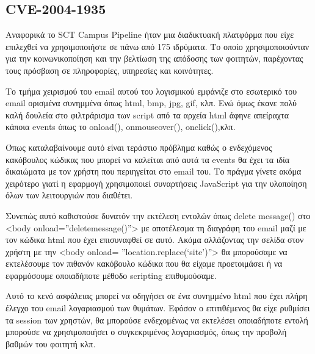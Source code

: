 \subsection{CVE-2004-1935}

\noindent
Αναφορικά το SCT Campus Pipeline ήταν μια διαδικτυακή πλατφόρμα που είχε επιλεχθεί να χρησιμοποιήστε σε πάνω από 175 ιδρύματα. Το οποίο χρησιμοποιούνταν για την κοινωνικοποίηση και την βελτίωση της απόδοσης των φοιτητών, παρέχοντας τους πρόσβαση σε πληροφορίες, υπηρεσίες και κοινότητες.


\noindent
Το τμήμα χειρισμού του email αυτού του λογισμικού εμφάνιζε στο εσωτερικό του email ορισμένα συνημμένα όπως html, bmp, jpg, gif, κλπ. Ενώ όμως έκανε πολύ καλή δουλεία στο φιλτράρισμα των script από τα αρχεία html άφηνε απείραχτα κάποια events όπως το onload(), onmouseover(), onclick(),κλπ. 

\noindent
Όπως καταλαβαίνουμε αυτό είναι τεράστιο πρόβλημα καθώς ο ενδεχόμενος κακόβουλος κώδικας που μπορεί να καλείται από αυτά τα events θα έχει τα ιδία δικαιώματα με τον χρήστη που περιηγείται στο email του. Το πράγμα γίνετε ακόμα χειρότερο γιατί η εφαρμογή χρησιμοποιεί συναρτήσεις JavaScript για την υλοποίηση όλων των λειτουργιών που διαθέτει. 

\noindent
Συνεπώς αυτό καθιστούσε δυνατόν την εκτέλεση εντολών όπως delete message() στο <body onload=”deletemessage()”> με αποτέλεσμα τη διαγράφη του email μαζί με τον κώδικα html που έχει επισυναφθεί σε αυτό. Ακόμα αλλάζοντας την σελίδα στον χρήστη με την <body onload= ”location.replace(‘site’)”> θα μπορούσαμε να εκτελέσουμε τον πιθανόν κακόβουλο κώδικα που  θα είχαμε προετοιμάσει ή να εφαρμόσουμε οποιαδήποτε μέθοδο scripting επιθυμούσαμε.

\noindent
Αυτό το κενό ασφάλειας μπορεί να οδηγήσει σε ένα συνημμένο html που έχει πλήρη έλεγχο του email λογαριασμού των θυμάτων. Εφόσον ο επιτιθέμενος θα είχε ρυθμίσει τα session των χρηστών, θα μπορούσε ενδεχομένως να εκτελέσει οποιαδήποτε εντολή μπορούσε να χρησιμοποιήσει ο συγκεκριμένος λογαριασμός, όπως την προβολή βαθμών του φοιτητή κλπ.

